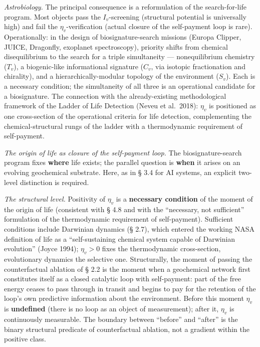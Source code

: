 \documentclass[pdflatex,sn-mathphys-ay]{sn-jnl}
\begin{document}
\emph{Astrobiology.} The principal consequence is a reformulation of the search-for-life program. Most objects pass the \(I_v\)-screening (structural potential is universally high) and fail the \(\eta_v\)-verification (actual closure of the self-payment loop is rare). Operationally: in the design of biosignature-search missions (Europa Clipper, JUICE, Dragonfly, exoplanet spectroscopy), priority shifts from chemical disequilibrium to the search for a triple simultaneity --- nonequilibrium chemistry (\(T_v\)), a biogenic-like informational signature (\(C_v\), via isotopic fractionation and chirality), and a hierarchically-modular topology of the environment (\(S_v\)). Each is a necessary condition; the simultaneity of all three is an operational candidate for a biosignature. The connection with the already-existing methodological framework of the Ladder of Life Detection (Neveu et al.~2018): \(\eta_v\) is positioned as one cross-section of the operational criteria for life detection, complementing the chemical-structural rungs of the ladder with a thermodynamic requirement of self-payment.

\emph{The origin of life as closure of the self-payment loop.} The biosignature-search program fixes \textbf{where} life exists; the parallel question is \textbf{when} it arises on an evolving geochemical substrate. Here, as in § 3.4 for AI systems, an explicit two-level distinction is required.

\emph{The structural level.} Positivity of \(\eta_v\) is a \textbf{necessary condition} of the moment of the origin of life (consistent with § 4.8 and with the ``necessary, not sufficient'' formulation of the thermodynamic requirement of self-payment). Sufficient conditions include Darwinian dynamics (§ 2.7), which entered the working NASA definition of life as a ``self-sustaining chemical system capable of Darwinian evolution'' (Joyce 1994); \(\eta_v > 0\) fixes the thermodynamic cross-section, evolutionary dynamics the selective one. Structurally, the moment of passing the counterfactual ablation of § 2.2 is the moment when a geochemical network first constitutes itself as a closed catalytic loop with self-payment: part of the free energy ceases to pass through in transit and begins to pay for the retention of the loop's own predictive information about the environment. Before this moment \(\eta_v\) is \textbf{undefined} (there is no loop as an object of measurement); after it, \(\eta_v\) is continuously measurable. The boundary between ``before'' and ``after'' is the binary structural predicate of counterfactual ablation, not a gradient within the positive class.
\end{document}
